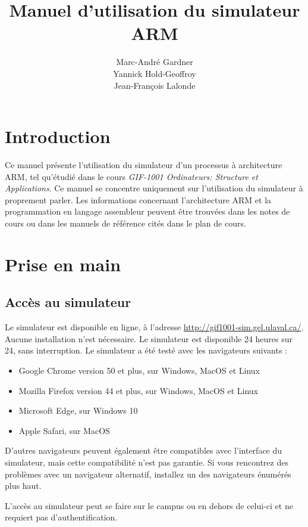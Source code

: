 \documentclass{tufte-handout}
\title{Manuel d'utilisation du simulateur ARM}
\author{Marc-André Gardner\\Yannick Hold-Geoffroy\\Jean-François Lalonde}
\begin{document}
\maketitle%


\section{Introduction}

Ce manuel présente l'utilisation du simulateur d'un processus à architecture ARM, tel qu'étudié dans le cours \textit{GIF-1001 Ordinateurs: Structure et Applications}. Ce manuel se concentre uniquement sur l'utilisation du simulateur à proprement parler. Les informations concernant l'architecture ARM et la programmation en langage assembleur peuvent être trouvées dans les notes de cours ou dans les manuels de référence cités dans le plan de cours.

\section{Prise en main}

\subsection{Accès au simulateur}

Le simulateur est disponible en ligne, à l'adresse \url{http://gif1001-sim.gel.ulaval.ca/}. Aucune installation n'est nécessaire. Le simulateur est disponible 24 heures sur 24, sans interruption. Le simulateur a été testé avec les navigateurs suivants :
\begin{itemize}
	\item Google Chrome version 50 et plus, sur Windows, MacOS et Linux
	\item Mozilla Firefox version 44 et plus, sur Windows, MacOS et Linux
	\item Microsoft Edge, sur Windows 10
	\item Apple Safari, sur MacOS
\end{itemize}

D'autres navigateurs peuvent également être compatibles avec l'interface du simulateur, mais cette compatibilité n'est pas garantie. Si vous rencontrez des problèmes avec un navigateur alternatif, installez un des navigateurs énumérés plus haut.

L'accès au simulateur peut se faire sur le campus ou en dehors de celui-ci et ne requiert pas d'authentification.
\end{document}
